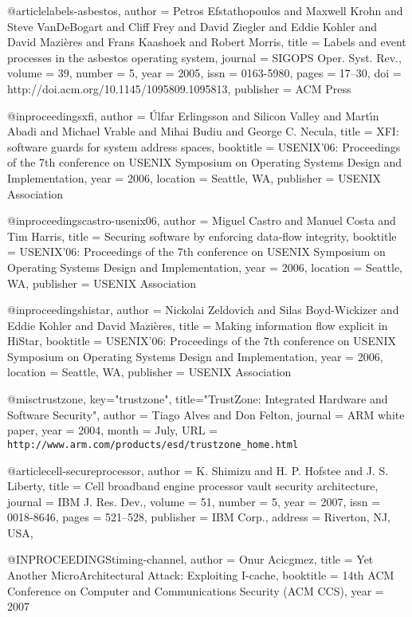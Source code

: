 @article{labels-asbestos, 
   author = {Petros Efstathopoulos and Maxwell Krohn and Steve VanDeBogart and Cliff Frey and David Ziegler and Eddie Kohler and David Mazi\`{e}res and Frans Kaashoek and Robert Morris},
 title = {Labels and event processes in the asbestos operating system},
 journal = {SIGOPS Oper. Syst. Rev.},
 volume = {39},
 number = {5},
 year = {2005},
 issn = {0163-5980},
 pages = {17--30},
 doi = {http://doi.acm.org/10.1145/1095809.1095813},
 publisher = {ACM Press}
 }

@inproceedings{xfi,
 author = {\'{U}lfar Erlingsson and Silicon Valley and Mart\'{\i}n Abadi and Michael Vrable and Mihai Budiu and George C. Necula},
 title = {XFI: software guards for system address spaces},
 booktitle = {USENIX'06: Proceedings of the 7th conference on USENIX Symposium on Operating Systems Design and Implementation},
 year = {2006},
 location = {Seattle, WA},
 publisher = {USENIX Association}
 }

@inproceedings{castro-usenix06,
 author = {Miguel Castro and Manuel Costa and Tim Harris},
 title = {Securing software by enforcing data-flow integrity},
 booktitle = {USENIX'06: Proceedings of the 7th conference on USENIX Symposium on Operating Systems Design and Implementation},
 year = {2006},
 location = {Seattle, WA},
 publisher = {USENIX Association}
 }

@inproceedings{histar,
 author = {Nickolai Zeldovich and Silas Boyd-Wickizer and Eddie Kohler and David Mazi\`{e}res},
 title = {Making information flow explicit in HiStar},
 booktitle = {USENIX'06: Proceedings of the 7th conference on USENIX Symposium on Operating Systems Design and Implementation},
 year = {2006},
 location = {Seattle, WA},
 publisher = {USENIX Association}
 }

@misc{trustzone,
key="trustzone",
title="{TrustZone: Integrated Hardware and Software Security}", 
author = {Tiago Alves and Don Felton},
journal = {ARM white paper},
year = {2004},
month = {July},
URL = {\verb+http://www.arm.com/products/esd/trustzone_home.html+}
}

@article{cell-secureprocessor,
 author = {K. Shimizu and H. P. Hofstee and J. S. Liberty},
 title = {Cell broadband engine processor vault security architecture},
 journal = {IBM J. Res. Dev.},
 volume = {51},
 number = {5},
 year = {2007},
 issn = {0018-8646},
 pages = {521--528},
 publisher = {IBM Corp.},
 address = {Riverton, NJ, USA},
 }

@INPROCEEDINGS{timing-channel,
    author = {Onur Acicgmez},
    title = {Yet Another MicroArchitectural Attack: Exploiting I-cache},
    booktitle = {14th ACM Conference on Computer and Communications Security (ACM CCS)},
    year = {2007}
}   

